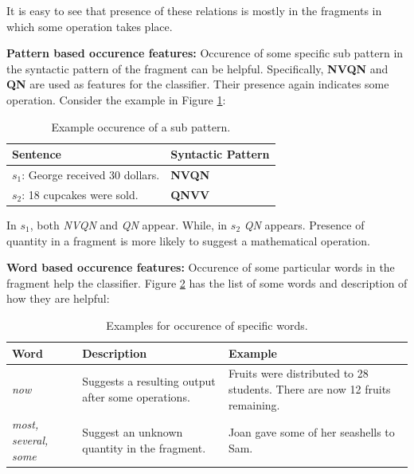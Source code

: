 \documentclass[11pt]{article}
\begin{document}
It is easy to see that presence of these relations is mostly in the fragments in which some operation takes place.

\textbf{Pattern based occurence features:} Occurence of some specific sub pattern in the syntactic pattern of the fragment can be helpful. Specifically, \textbf{NVQN} and \textbf{QN} are used as features for the classifier. Their presence again indicates some operation. Consider the example in Figure \ref{figure:16}:

\begin{table}[h!]
\centering
\begin{tabular}{ | m{20em} | m{5em} |}
\hline
 \textbf{Sentence} & \textbf{Syntactic Pattern}\\
\hline
\begin{math}s_{1}\end{math}: George received 30 dollars. & \textbf{NVQN} \\
\hline
\begin{math}s_{2}\end{math}: 18 cupcakes were sold. & \textbf{QNVV} \\
\hline
\end{tabular}
\caption{Example occurence of a sub pattern.}
\label{figure:16}
\end{table}

In \begin{math}s_{1}\end{math}, both \textit{NVQN} and \textit{QN} appear. While, in \begin{math}s_{2}\end{math} \textit{QN} appears. Presence of quantity in a fragment is more likely to suggest a mathematical operation. 

\textbf{Word based occurence features:} Occurence of some particular words in the fragment help the classifier. Figure \ref{figure:17} has the list of some words and description of how they are helpful:

\begin{table}[h!]
\centering
\begin{tabular}{ | m{5em} | m{15em} | m{15em} | }
\hline
 \textbf{Word} & \textbf{Description} & \textbf{Example}\\
\hline
\textit{now} & Suggests a resulting output after some operations. & Fruits were distributed to 28 students. There are now 12 fruits remaining. \\
\hline
\textit{most, several, some} & Suggest an unknown quantity in the fragment. & Joan gave some of her seashells to Sam. \\
\hline
\end{tabular}
\caption{Examples for occurence of specific words.}
\label{figure:17}
\end{table}
\end{document}
